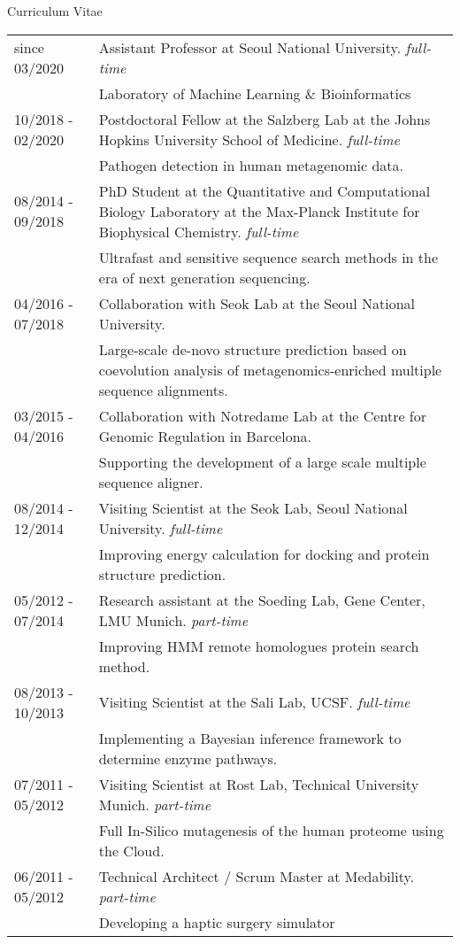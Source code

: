 \documentclass{resume} %
\begin{document}
\begin{rSection}{Curriculum Vitae}
\begin{tabular}{p{3.6cm}p{13.0cm}}
since 03/2020 & 
Assistant Professor at Seoul National University. \textit{full-time} \\ & Laboratory of Machine Learning \& Bioinformatics
\\[1.mm]
10/2018 - 02/2020 & 
Postdoctoral Fellow at the Salzberg Lab at the Johns Hopkins University School of Medicine. \textit{full-time} \\ & Pathogen detection in human metagenomic data.
\\[1.mm]
08/2014 - 09/2018 & 
PhD Student at the Quantitative and Computational Biology Laboratory at the Max-Planck Institute for Biophysical Chemistry. \textit{full-time} \\ & Ultrafast and sensitive sequence search methods in the era of next generation sequencing. 
\\[1.mm]
04/2016 - 07/2018 & Collaboration with Seok Lab at the Seoul National University. \\&Large-scale de-novo structure prediction based on coevolution analysis of metagenomics-enriched multiple sequence alignments.
\\[1.mm]
03/2015 - 04/2016 & Collaboration with Notredame Lab at the Centre for Genomic Regulation in Barcelona. \\ & Supporting the development of a large scale multiple sequence aligner.
\\[1.mm]
08/2014 - 12/2014 & Visiting Scientist at the Seok Lab, Seoul National University. \textit{full-time} \\ & Improving energy calculation for docking and protein structure prediction.
\\[1.mm]
05/2012 - 07/2014 & Research assistant at the Soeding Lab, Gene Center, LMU Munich. \textit{part-time} \\ & Improving HMM remote homologues protein search method.
\\[1.mm]
08/2013 - 10/2013 & Visiting Scientist at the Sali Lab, UCSF. \textit{full-time} \\ & Implementing a Bayesian inference framework to determine enzyme pathways.
\\[1.mm]
07/2011 - 05/2012 & Visiting Scientist at Rost Lab, Technical University Munich. \textit{part-time} \\ & Full In-Silico mutagenesis of the human proteome using the Cloud. 
\\[1.mm]
06/2011 - 05/2012 & Technical Architect / Scrum Master at Medability. \textit{part-time} \\ & Developing a haptic surgery simulator

\end{tabular}
\end{rSection}
\end{document}
